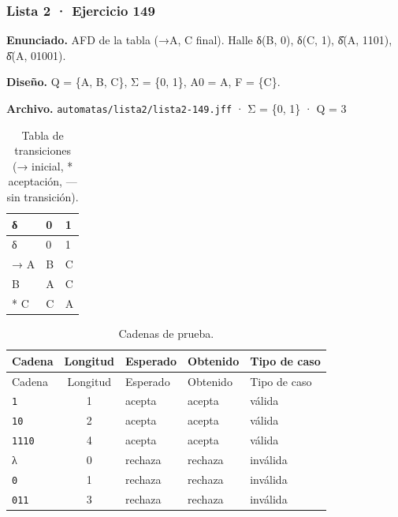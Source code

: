 
\hypertarget{lista-2-ejercicio-149}{%
\subsubsection{Lista 2 · Ejercicio 149}\label{lista-2-ejercicio-149}}

\textbf{Enunciado.} AFD de la tabla (→A, C final). Halle δ(B, 0), δ(C, 1), δ̂(A, 1101), δ̂(A, 01001).

\textbf{Diseño.} Q = \{A, B, C\}, Σ = \{0, 1\}, A0 = A, F = \{C\}.

\textbf{Archivo.} \texttt{automatas/lista2/lista2-149.jff} · Σ = \{0, 1\} · \textbar Q\textbar{} = 3

\begin{longtable}[]{@{}lll@{}}
\caption{Tabla de transiciones (→ inicial, * aceptación, --- sin transición).}\tabularnewline
\toprule\noalign{}
δ & 0 & 1 \\
\midrule\noalign{}
\endfirsthead
\toprule\noalign{}
δ & 0 & 1 \\
\midrule\noalign{}
\endhead
\bottomrule\noalign{}
\endlastfoot
→ A & B & C \\
B & A & C \\
* C & C & A \\
\end{longtable}

\begin{longtable}[]{@{}lclll@{}}
\caption{Cadenas de prueba.}\tabularnewline
\toprule\noalign{}
Cadena & Longitud & Esperado & Obtenido & Tipo de caso \\
\midrule\noalign{}
\endfirsthead
\toprule\noalign{}
Cadena & Longitud & Esperado & Obtenido & Tipo de caso \\
\midrule\noalign{}
\endhead
\bottomrule\noalign{}
\endlastfoot
\texttt{1} & 1 & acepta & acepta & válida \\
\texttt{10} & 2 & acepta & acepta & válida \\
\texttt{1110} & 4 & acepta & acepta & válida \\
λ & 0 & rechaza & rechaza & inválida \\
\texttt{0} & 1 & rechaza & rechaza & inválida \\
\texttt{011} & 3 & rechaza & rechaza & inválida \\
\end{longtable}

